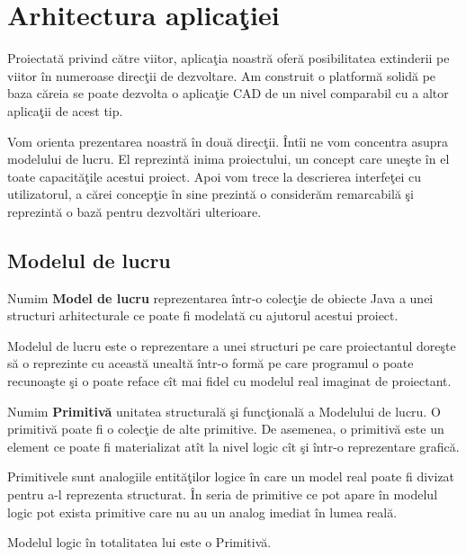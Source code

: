 \chapter{Arhitectura aplicaţiei}
\label{chapter:arh}

Proiectată privind către viitor, aplicaţia noastră oferă posibilitatea 
extinderii pe viitor în numeroase direcţii de dezvoltare. Am construit o 
platformă solidă pe baza căreia se poate dezvolta o aplicaţie CAD de un nivel 
comparabil cu a altor aplicaţii de acest tip.

Vom orienta prezentarea noastră în două direcţii. Întîi ne vom concentra asupra 
modelului de lucru. El reprezintă inima proiectului, un concept care uneşte în 
el toate capacităţile acestui proiect. Apoi vom trece la descrierea interfeţei 
cu utilizatorul, a cărei concepţie în sine prezintă o considerăm remarcabilă şi 
reprezintă o bază pentru dezvoltări ulterioare.

\section{Modelul de lucru}

\begin{definition}
\label{define:model}
Numim \textbf{Model de lucru} reprezentarea într-o colecţie de obiecte Java a 
unei structuri arhitecturale ce poate fi modelată cu ajutorul acestui proiect.
\end{definition}

Modelul de lucru este o reprezentare a unei structuri pe care proiectantul 
doreşte să o reprezinte cu această unealtă într-o formă pe care programul o 
poate recunoaşte şi o poate reface cît mai fidel cu modelul real imaginat de 
proiectant.

\begin{definition}
\label{define:primitive}
Numim \textbf{Primitivă} unitatea structurală şi funcţională a Modelului de 
lucru. O primitivă poate fi o colecţie de alte primitive. De asemenea, o 
primitivă este un element ce poate fi materializat atît la nivel logic cît şi 
într-o reprezentare grafică.
\end{definition}

Primitivele sunt analogiile entităţilor logice în care un model real poate fi 
divizat pentru a-l reprezenta structurat. În seria de primitive ce pot apare în 
modelul logic pot exista primitive care nu au un analog imediat în lumea reală.

\begin{statement}
Modelul logic în totalitatea lui este o Primitivă.
\end{statement}

